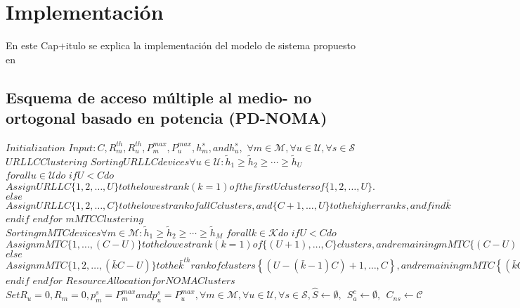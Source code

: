 
\chapter{Implementación} %

\label{Chapter6} %

En este Cap+itulo se explica la implementación del modelo de sistema propuesto en 


\section{Esquema de acceso múltiple al medio- no ortogonal basado en potencia (PD-NOMA)}
$Initialization$
$Input: C , R_{m}^{th} , R_{u}^{th} , P_{m}^{max} , P_{u}^{max} , h_{m}^{s} , and h_{u}^{s} ,$
$\forall m \in \mathcal {M} , \forall u \in \mathcal {U} , \forall s \in \mathcal {S}$
$URLLC Clustering$
$Sorting URLLC devices \forall u \in \mathcal {U} : {\tilde h_{1}} \geq {\tilde h_{2}} \geq \cdots \geq {\tilde h_{U}}$
$for all u \in \mathcal {U} do$
$if U < C do$
$Assign URLLC \{ 1,2,\ldots,U\} to the lowest rank (k=1 ) of the first U clusters of \{ 1, 2, \ldots, U\} .$
$else$
$Assign URLLC \{ 1,2,\ldots,C\} to the lowest rank of all C clusters, and \{ C + 1,\ldots,U\} to the higher ranks, and find \bar {k}$
$end if$
$end for$
$mMTC Clustering$
$Sorting mMTC devices \forall m \in \mathcal {M} : {\tilde h_{1}} \geq {\tilde h_{2}} \geq \cdots \geq {\tilde h_{M}}$
$for all k \in \mathcal {K} do$
$if U < C do$
$Assign mMTC \{ 1,\ldots,(C-U)\} to the lowest rank (k=1 ) of \{ (U+1),\ldots,C\} clusters, and remaining mMTC \{(C-U)+1, \ldots,M\} to the next available ranks of clusters.$
$else$
$Assign mMTC \{ 1, 2, \ldots, (\bar {k}C-U)\} to the \bar {k}^{th} rank of clusters \left \{{ {(U - (\bar k - 1)C) + 1,\ldots,C} }\right \} , and remaining mMTC \left \{{ {(\bar kC - U) + 1,\ldots,M} }\right \} to the next available ranks of clusters.$
$end if$
$end for$
$Resource Allocation for NOMA Clusters$
$Set {R_{u}} = 0 , {R_{m}} = 0 , p_{m}^{s}=P_{m}^{max} and p_{u}^{s}= P_{u}^{max} , \forall m \in \mathcal {M} , \forall u \in \mathcal {U} , \forall s \in \mathcal {S} , {\hat S} \leftarrow \emptyset,~~S_{a}^{c} \leftarrow \emptyset,~~{C_{ns}} \leftarrow \mathcal {C}$
